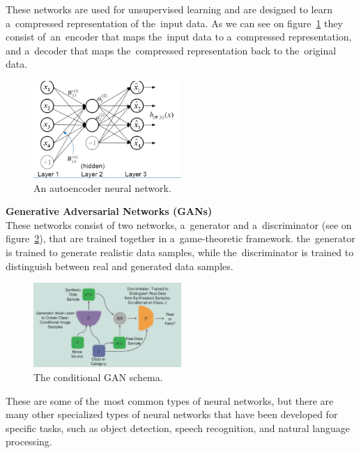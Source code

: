 These networks are used for unsupervised learning and are designed to learn a~compressed representation of the~input data. As we can see on figure~\ref{fig:ann} they consist of~an~encoder that maps the~input data to a~compressed representation, and a~decoder that maps the~compressed representation back to the~original data.
    \begin{center}
        \begin{figure}[!ht]
            \centering
            \includegraphics[width=0.5\textwidth]{figures/ann}
            \caption{An autoencoder neural network. \cite{luo2018distributed}}
            \label{fig:ann}
        \end{figure}
    \end{center}
\textbf{Generative Adversarial Networks (GANs)}\\
These networks consist of two networks, a~generator and a~discriminator (see on figure~\ref{fig:gan}), that are trained together in a~game-theoretic framework. the~generator is trained to generate realistic data samples, while the~discriminator is trained to distinguish between real and generated data samples.
    \begin{center}
        \begin{figure}[!ht]
            \centering
            \includegraphics[width=0.5\textwidth]{figures/gan}
            \caption{The conditional GAN schema. \cite{creswell2018generative}}
            \label{fig:gan}
        \end{figure}
    \end{center}

These are some of the~most common types of neural networks, but there are many other specialized types of neural
networks that have been developed for specific tasks, such as object detection, speech recognition, and
natural language processing.\\

